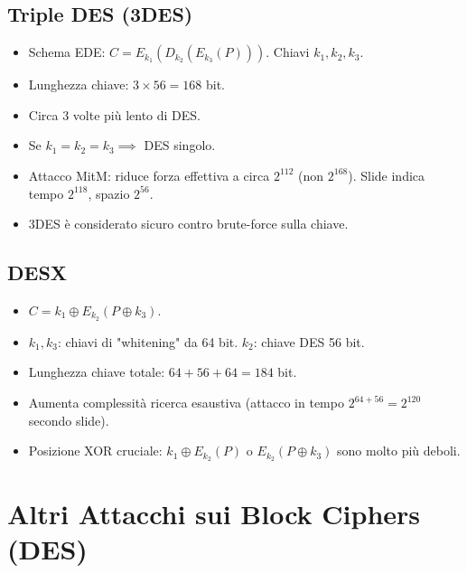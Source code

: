 \documentclass{article}
\begin{document}
\subsection{Triple DES (3DES)}
\begin{itemize}
    \item Schema EDE: $C = E_{k_1}(D_{k_2}(E_{k_3}(P)))$. Chiavi $k_1, k_2, k_3$.
    \item Lunghezza chiave: $3 \times 56 = 168$ bit.
    \item Circa 3 volte più lento di DES.
    \item Se $k_1 = k_2 = k_3 \implies$ DES singolo.
    \item Attacco MitM: riduce forza effettiva a circa $2^{112}$ (non $2^{168}$). Slide indica tempo $2^{118}$, spazio $2^{56}$.
    \item 3DES è considerato sicuro contro brute-force sulla chiave.
\end{itemize}

\subsection{DESX}
\begin{itemize}
    \item $C = k_1 \oplus E_{k_2}(P \oplus k_3)$.
    \item $k_1, k_3$: chiavi di "whitening" da 64 bit. $k_2$: chiave DES 56 bit.
    \item Lunghezza chiave totale: $64+56+64 = 184$ bit.
    \item Aumenta complessità ricerca esaustiva (attacco in tempo $2^{64+56} = 2^{120}$ secondo slide).
    \item Posizione XOR cruciale: $k_1 \oplus E_{k_2}(P)$ o $E_{k_2}(P \oplus k_3)$ sono molto più deboli.
\end{itemize}

\section{Altri Attacchi sui Block Ciphers (DES)}
\end{document}
